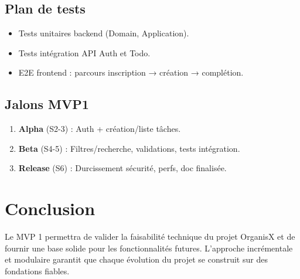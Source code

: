 \subsection{Plan de tests}
\begin{itemize}
	\item Tests unitaires backend (Domain, Application).
	\item Tests intégration API Auth et Todo.
	\item E2E frontend : parcours inscription → création → complétion.
\end{itemize}

\subsection{Jalons MVP1}
\begin{enumerate}
	\item \textbf{Alpha} (S2-3) : Auth + création/liste tâches.
	\item \textbf{Beta} (S4-5) : Filtres/recherche, validations, tests intégration.
	\item \textbf{Release} (S6) : Durcissement sécurité, perfs, doc finalisée.
\end{enumerate}

\section{Conclusion}
Le MVP 1 permettra de valider la faisabilité technique du projet OrganisX et de fournir une base solide pour les fonctionnalités futures. L’approche incrémentale et modulaire garantit que chaque évolution du projet se construit sur des fondations fiables.
